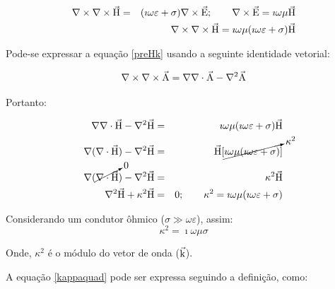         {\setlength\arraycolsep{2pt}
        \begin{eqnarray}
            \label{preHk}
            \nabla \times \nabla \times \vec{\textrm{H}} &=& (\imath \omega \varepsilon + \sigma) \nabla \times \vec{\textrm{E}}; \qquad \nabla \times \vec{\textrm{E}} = \imath \omega \mu \vec{\textrm{H}} \nonumber \\
            & &\nabla \times \nabla \times \vec{\textrm{H}} = \imath \omega \mu (\imath \omega \varepsilon + \sigma) \vec{\textrm{H}}            
        \end{eqnarray}}
        
        Pode-se expressar a equação \ref{preHk} usando a seguinte identidade vetorial:
        
        \begin{equation}
            \nabla \times \nabla \times \vec{\textrm{A}} = \nabla \nabla \cdot \vec{\textrm{A}} - \nabla^2 \vec{\textrm{A}} 
        \end{equation}

        \noindent Portanto:
        
        {\setlength\arraycolsep{2pt}
        \begin{eqnarray}
            \label{difH}
            \nabla \nabla \cdot \vec{\textrm{H}} - \nabla^2 \vec{\textrm{H}} & = & \imath \omega \mu (\imath \omega \varepsilon + \sigma) \vec{\textrm{H}} \nonumber \\
            \nabla (\nabla \cdot \vec{\textrm{H}}) - \nabla^2 \vec{\textrm{H}} & = & \vec{\textrm{H}}[\cancelto{\kappa^2}{\imath \omega \mu (\imath \omega \varepsilon + \sigma)}] \nonumber \\
            \nabla (\cancelto{0}{\nabla \cdot \vec{\textrm{H}}}) - \nabla^2 \vec{\textrm{H}} & = & \kappa^2 \vec{\textrm{H}} \nonumber \\
            \nabla^2 \vec{\textrm{H}} + \kappa^2 \vec{\textrm{H}} & = &  0; \qquad \kappa^2 = \imath \omega \mu (\imath \omega \varepsilon + \sigma)
        \end{eqnarray}}        
        
        Considerando um condutor ôhmico ($\sigma \gg \omega \varepsilon$), assim:
        \begin{equation}
            \label{kappaquad}
            \kappa^2 = \imath \omega \mu \sigma
        \end{equation}
        
        \noindent Onde, $\kappa^2$ é o módulo do vetor de onda ($\vec{\textrm{k}}$).
        
        A equação \ref{kappaquad} pode ser expressa seguindo a definição, como:
        

